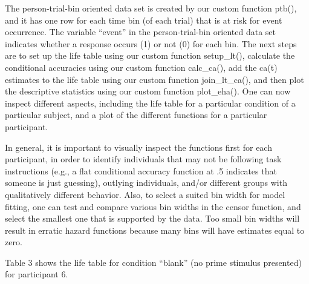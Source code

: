\documentclass[
  man, donotrepeattitle,floatsintext]{apa6}
\begin{document}
The person-trial-bin oriented data set is created by our custom function ptb(), and it has one row for each time bin (of each trial) that is at risk for event occurrence. The variable ``event'' in the person-trial-bin oriented data set indicates whether a response occurs (1) or not (0) for each bin. The next steps are to set up the life table using our custom function setup\_lt(), calculate the conditional accuracies using our custom function calc\_ca(), add the ca(t) estimates to the life table using our custom function join\_lt\_ca(), and then plot the descriptive statistics using our custom function plot\_eha().
One can now inspect different aspects, including the life table for a particular condition of a particular subject, and a plot of the different functions for a particular participant.

In general, it is important to visually inspect the functions first for each participant, in order to identify individuals that may not be following task instructions (e.g., a flat conditional accuracy function at .5 indicates that someone is just guessing), outlying individuals, and/or different groups with qualitatively different behavior. Also, to select a suited bin width for model fitting, one can test and compare various bin widths in the censor function, and select the smallest one that is supported by the data. Too small bin widths will result in erratic hazard functions because many bins will have estimates equal to zero.

Table 3 shows the life table for condition ``blank'' (no prime stimulus presented) for participant 6.
\end{document}
